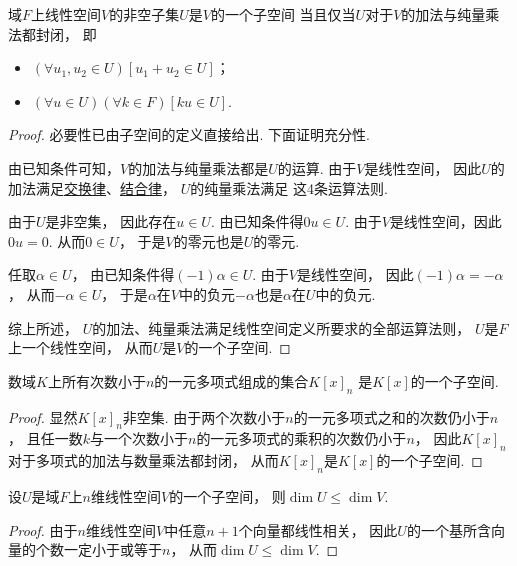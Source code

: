 \begin{theorem}\label{theorem:线性空间.子空间的判定}
域\(F\)上线性空间\(V\)的非空子集\(U\)是\(V\)的一个子空间
当且仅当\(U\)对于\(V\)的加法与纯量乘法都封闭，
即\begin{itemize}
	\item \((\forall u_1,u_2\in U)[u_1+u_2 \in U]\)；
	\item \((\forall u\in U)(\forall k\in F)[ku\in U]\).
\end{itemize}
\begin{proof}
必要性已由子空间的定义直接给出.
下面证明充分性.

由已知条件可知，\(V\)的加法与纯量乘法都是\(U\)的运算.
由于\(V\)是线性空间，
因此\(U\)的加法满足\hyperref[definition:线性空间.运算法则1]{交换律}、\hyperref[definition:线性空间.运算法则2]{结合律}，
\(U\)的纯量乘法满足  这4条运算法则.

由于\(U\)是非空集，
因此存在\(u \in U\).
由已知条件得\(0 u \in U\).
由于\(V\)是线性空间，因此\(0 u = 0\).
从而\(0 \in U\)，
于是\(V\)的零元也是\(U\)的零元.

任取\(\alpha \in U\)，
由已知条件得\((-1) \alpha \in U\).
由于\(V\)是线性空间，
因此\((-1) \alpha = -\alpha\)，
从而\(-\alpha \in U\)，
于是\(\alpha\)在\(V\)中的负元\(-\alpha\)也是\(\alpha\)在\(U\)中的负元.

综上所述，
\(U\)的加法、纯量乘法满足线性空间定义所要求的全部运算法则，
\(U\)是\(F\)上一个线性空间，
从而\(U\)是\(V\)的一个子空间.
\end{proof}
\end{theorem}

\begin{example}
数域\(K\)上所有次数小于\(n\)的一元多项式组成的集合\(K[x]_n\)
是\(K[x]\)的一个子空间.
\begin{proof}
显然\(K[x]_n\)非空集.
由于两个次数小于\(n\)的一元多项式之和的次数仍小于\(n\)，
且任一数\(k\)与一个次数小于\(n\)的一元多项式的乘积的次数仍小于\(n\)，
因此\(K[x]_n\)对于多项式的加法与数量乘法都封闭，
从而\(K[x]_n\)是\(K[x]\)的一个子空间.
\end{proof}
\end{example}

\begin{proposition}
设\(U\)是域\(F\)上\(n\)维线性空间\(V\)的一个子空间，
则\(\dim U\leq\dim V\).
\begin{proof}
由于\(n\)维线性空间\(V\)中任意\(n+1\)个向量都线性相关，
因此\(U\)的一个基所含向量的个数一定小于或等于\(n\)，
从而\(\dim U\leq\dim V\).
\end{proof}
\end{proposition}


